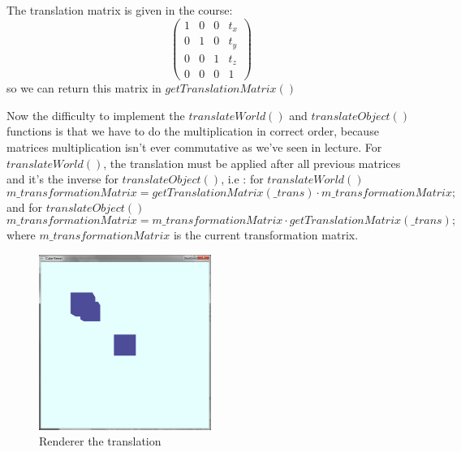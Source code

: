 \documentclass[10pt,a4paper]{report}
\begin{document}
The translation matrix is given in the course: 
\[ \left( \begin{array}{cccc}
1 & 0 & 0 & t_x\\
0 & 1 & 0 & t_y\\
0 & 0 & 1 & t_z\\
0 & 0 & 0 & 1\end{array} \right)\] 
so we can return this matrix in $getTranslationMatrix()$

Now the difficulty to implement the $translateWorld()$ and $translateObject()$ functions is that we have to do the multiplication in correct order, because matrices multiplication isn't ever commutative as we've seen in lecture.
For $translateWorld()$, the translation must be applied after all previous matrices and it's the inverse for $translateObject()$, i.e :
for $translateWorld()$
$$m\_transformationMatrix = getTranslationMatrix(\_trans) \cdot m\_transformationMatrix;$$
and for $translateObject()$
$$m\_transformationMatrix = m\_transformationMatrix \cdot getTranslationMatrix(\_trans);$$
where $m\_transformationMatrix$ is the current transformation matrix.

\begin{figure}[h!]
\caption{Renderer the translation}
  \centering
    \includegraphics[width=0.5\textwidth]{3-2.png}
\end{figure}
\end{document}
